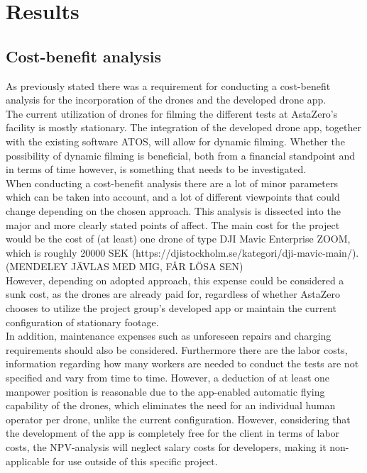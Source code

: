 \chapter{Results}

\section{Cost-benefit analysis}
As previously stated there was a requirement for conducting a cost-benefit analysis for the incorporation of the drones and the developed drone app. 
\\

The current utilization of drones for filming the different tests at AstaZero’s facility is mostly stationary. The integration of the developed drone app, together with the existing software ATOS, will allow for dynamic filming. Whether the possibility of dynamic filming is beneficial, both from a financial standpoint and in terms of time however, is something that needs to be investigated. 
\\

When conducting a cost-benefit analysis there are a lot of minor parameters which can be taken into account, and a lot of different viewpoints that could change depending on the chosen approach. This analysis is dissected into the major and more clearly stated points of affect. 
The main cost for the project would be the cost of (at least) one drone of type DJI Mavic Enterprise ZOOM, which is roughly 20000 SEK (https://djistockholm.se/kategori/dji-mavic-main/).(MENDELEY JÄVLAS MED MIG, FÅR LÖSA SEN)
\\

However, depending on adopted approach, this expense could be considered a sunk cost, as the drones are already paid for, regardless of whether AstaZero chooses to utilize the project group's developed app or maintain the current configuration of stationary footage.
\\

In addition, maintenance expenses such as unforeseen repairs and charging requirements should also be considered.
Furthermore there are the labor costs, information regarding how many workers are needed to conduct the tests are not specified and vary from time to time. However, a deduction of at least one manpower position is reasonable due to the app-enabled automatic flying capability of the drones, which eliminates the need for an individual human operator per drone, unlike the current configuration. However, considering that the development of the app is completely free for the client in terms of labor costs, the NPV-analysis will neglect salary costs for developers, making it non-applicable for use outside of this specific project.  
\\

